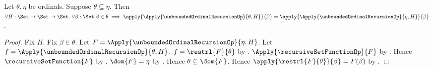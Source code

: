 \begin{theorem}\label{unbounded_ordinal_recursion_value_stability}
    Let $\theta,\eta$ be ordinals.
    Suppose $\theta\subseteq\eta$.
    Then $\forall H:\Set\to\Set\to\Set.\ \forall\beta:\Set.
        \beta\in\theta\implies
        \apply{\Apply{\unboundedOrdinalRecursionOp}{\theta,H}}
            {\beta}
        =\apply{\Apply{\unboundedOrdinalRecursionOp}{\eta,H}}
            {\beta}$.
\end{theorem}
\begin{proof}
    Fix $H$.
    Fix $\beta\in\theta$.
    Let $F=\Apply{\unboundedOrdinalRecursionOp}{\eta,H}$.
    Let $f=\Apply{\unboundedOrdinalRecursionOp}{\theta,H}$.
    $f=\restrl{F}{\theta}$ by
        .
    $\Apply{\recursiveSetFunctionOp}{F}$ by
        .
    Hence $\recursiveSetFunction{F}$ by
        .
    $\dom{F}=\eta$ by
        .
    Hence $\theta\subseteq\dom{F}$.
    Hence $\apply{\restrl{F}{\theta}}{\beta}=F(\beta)$ by
        .
\end{proof}
